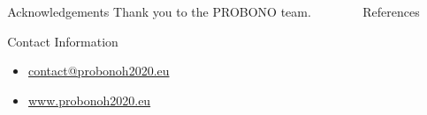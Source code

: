 \documentclass[final]{beamer}
\newlength{\sepmargin}
\newlength{\sepwid}
\newlength{\onecolwid}
\begin{document}
\begin{columns}[t]
\begin{column}{\onecolwid}
      \end{column}
      
      \begin{column}{\sepmargin} \end{column}
      \end{columns} 
       
      \begin{columns}[t] %
      
      \begin{column}{\sepmargin} \end{column}
        \begin{column}{\onecolwid} %
			\begin{block}{\large Acknowledgements}
                    Thank you to the PROBONO team.
				\end{block}	
                \vspace*{-0.9cm}
				\begin{alertblock}{\large Contact Information}
                \vspace*{-0.5cm}
					\begin{footnotesize}
					\begin{itemize}
						\item \href{mailto:luc.jonveaux@mottmac.com}{contact@probonoh2020.eu}
						\item \href{https://www.probonoh2020.eu/}{www.probonoh2020.eu}
					\end{itemize}
					\end{footnotesize}	
					
				\end{alertblock}
		    \end{column} %
			\begin{column}{\sepwid}\end{column} %
			\begin{column}{\onecolwid} %
              \begin{block}{\large References}
              	\nocite{*} %
					

\end{block}
\end{column}
\end{columns}
\end{document}
